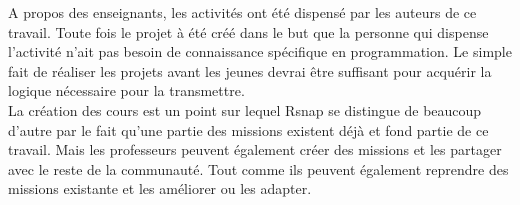 A propos des enseignants, les activités ont été dispensé par les auteurs de ce travail. Toute fois le projet à été créé dans le but que la personne qui dispense l'activité n'ait pas besoin de connaissance spécifique en programmation. Le simple fait de réaliser les projets avant les jeunes devrai être suffisant pour acquérir la logique nécessaire pour la transmettre.\\

La création des cours est un point sur lequel Rsnap se distingue de beaucoup d'autre par le fait qu'une partie des missions existent déjà et fond partie de ce travail. Mais les professeurs peuvent également créer des missions et les partager avec le reste de la communauté. Tout comme ils peuvent également reprendre des missions existante et les améliorer ou les adapter. %